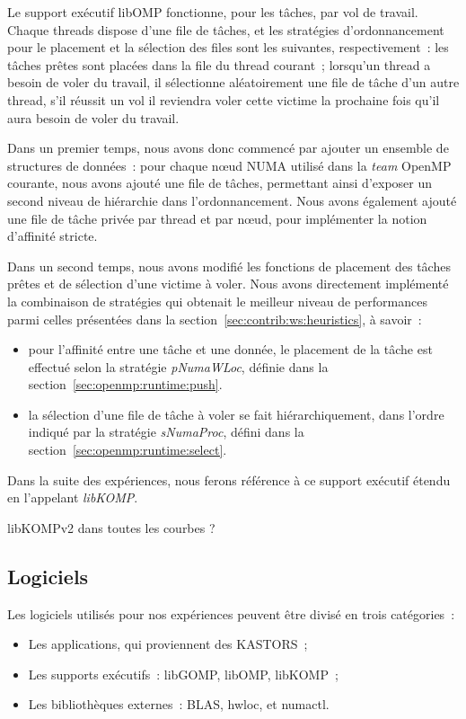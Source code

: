 Le support exécutif libOMP fonctionne, pour les tâches, par vol de travail.
Chaque threads dispose d'une file de tâches, et les stratégies d'ordonnancement pour le placement et la sélection des files sont les suivantes, respectivement~: les tâches prêtes sont placées dans la file du thread courant~; lorsqu'un thread a besoin de voler du travail, il sélectionne aléatoirement une file de tâche d'un autre thread, s'il réussit un vol il reviendra voler cette victime la prochaine fois qu'il aura besoin de voler du travail.

Dans un premier temps, nous avons donc commencé par ajouter un ensemble de structures de données~: pour chaque nœud NUMA utilisé dans la \emph{team} OpenMP courante, nous avons ajouté une file de tâches, permettant ainsi d'exposer un second niveau de hiérarchie dans l'ordonnancement.
Nous avons également ajouté une file de tâche privée par thread et par nœud, pour implémenter la notion d'affinité stricte.

Dans un second temps, nous avons modifié les fonctions de placement des tâches prêtes et de sélection d'une victime à voler.
Nous avons directement implémenté la combinaison de stratégies qui obtenait le meilleur niveau de performances parmi celles présentées dans la section~\ref{sec:contrib:ws:heuristics}, à savoir~:
\begin{itemize}
  \item pour l'affinité entre une tâche et une donnée, le placement de la tâche est effectué selon la stratégie \emph{pNumaWLoc}, définie dans la section~\ref{sec:openmp:runtime:push}.
  \item la sélection d'une file de tâche à voler se fait hiérarchiquement, dans l'ordre indiqué par la stratégie \emph{sNumaProc}, défini dans la section~\ref{sec:openmp:runtime:select}.
\end{itemize}

Dans la suite des expériences, nous ferons référence à ce support exécutif étendu en l'appelant \emph{libKOMP}.
\begin{todo}
  libKOMPv2 dans toutes les courbes ?
\end{todo}


\subsection{Logiciels}\label{sec:contribs:perf_eval:logiciels}

Les logiciels utilisés pour nos expériences peuvent être divisé en trois catégories~:
\begin{itemize}
  \item Les applications, qui proviennent des KASTORS~;
  \item Les supports exécutifs~: libGOMP, libOMP, libKOMP~;
  \item Les bibliothèques externes~: BLAS, hwloc, et numactl.
\end{itemize}

